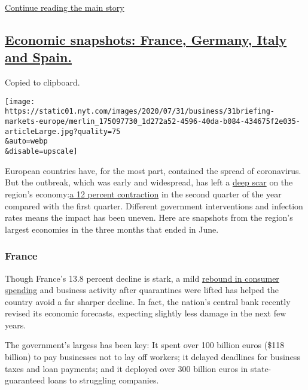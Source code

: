 \protect\hyperlink{after-dfp-ad-mid2}{Continue reading the main story}

\hypertarget{economic-snapshots-france-germany-italy-and-spain}{%
\subsection{\texorpdfstring{\protect\hyperlink{economic-snapshots-france-germany-italy-and-spain}{Economic
snapshots: France, Germany, Italy and
Spain.}}{Economic snapshots: France, Germany, Italy and Spain.}}\label{economic-snapshots-france-germany-italy-and-spain}}

Copied to clipboard.

\texttt{[image: https://static01.nyt.com/images/2020/07/31/business/31briefing-markets-europe/merlin\_175097730\_1d272a52-4596-40da-b084-434675f2e035-articleLarge.jpg?quality=75\\\&auto=webp\\\&disable=upscale]}

European countries have, for the most part, contained the spread of
coronavirus. But the outbreak, which was early and widespread, has left
a
\href{https://www.nytimes.com/live/2020/07/31/business/stock-market-today-coronavirus\#europes-economic-contraction-is-its-worst-on-record}{deep
scar} on the region's
economy:\href{https://ec.europa.eu/eurostat/documents/2995521/11156775/2-31072020-BP-EN.pdf/cbe7522c-ebfa-ef08-be60-b1c9d1bd385b}{a
12 percent contraction} in the second quarter of the year compared with
the first quarter. Different government interventions and infection
rates means the impact has been uneven. Here are snapshots from the
region's largest economies in the three months that ended in June.

\hypertarget{france}{%
\subsubsection{France}\label{france}}

Though France's 13.8 percent decline is stark, a mild
\href{https://www.nytimes.com/2020/07/14/business/as-europes-economies-reopen-consumers-go-on-a-spending-spree.html}{rebound
in consumer spending} and business activity after quarantines were
lifted has helped the country avoid a far sharper decline. In fact, the
nation's central bank recently revised its economic forecasts, expecting
slightly less damage in the next few years.

The government's largess has been key: It spent over 100 billion euros
(\$118 billion) to pay businesses not to lay off workers; it delayed
deadlines for business taxes and loan payments; and it deployed over 300
billion euros in state-guaranteed loans to struggling companies.

